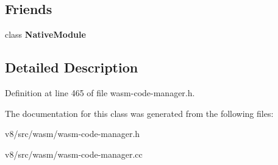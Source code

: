 \subsection*{Friends}
\begin{DoxyCompactItemize}
\item 
\mbox{\label{classv8_1_1internal_1_1wasm_1_1WasmCodeManager_ab2eba8bcd9cf5215e8ce842fad93a987}} 
class {\bfseries Native\+Module}
\end{DoxyCompactItemize}


\subsection{Detailed Description}


Definition at line 465 of file wasm-\/code-\/manager.\+h.



The documentation for this class was generated from the following files\+:\begin{DoxyCompactItemize}
\item 
v8/src/wasm/wasm-\/code-\/manager.\+h\item 
v8/src/wasm/wasm-\/code-\/manager.\+cc\end{DoxyCompactItemize}
